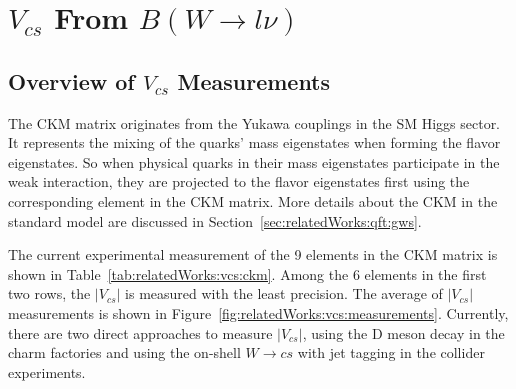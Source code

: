 
\section{$V_{cs}$ From $B(W\to l \nu)$ }
\label{sec:relatedWorks:vcs}

\subsection{Overview of $V_{cs}$ Measurements}

The CKM matrix originates from the Yukawa couplings in the SM Higgs sector. It represents the mixing of the quarks' mass eigenstates when forming the flavor eigenstates. So when physical quarks in their mass eigenstates participate in the weak interaction, they are projected to the flavor eigenstates first using the corresponding element in the CKM matrix. More details about the CKM in the standard model are discussed in Section~\ref{sec:relatedWorks:qft:gws}. 

\begin{table}[ht]
    \centering
    \setlength{\tabcolsep}{1.5em}
    \renewcommand{\arraystretch}{1.5}
    \caption{The current experimental world average of the 9 elements in the CKM matrix in the PDG \cite{pdg2020}.  }
    \label{tab:relatedWorks:vcs:ckm}
\end{table}


The current experimental measurement of the 9 elements in the CKM matrix \cite{pdg2020} is shown in Table~\ref{tab:relatedWorks:vcs:ckm}. Among the 6 elements in the first two rows, the $|V_{cs}|$ is measured with the least precision. The average of $|V_{cs}|$ measurements is shown in Figure~\ref{fig:relatedWorks:vcs:measurements}. Currently, there are two direct approaches to measure $|V_{cs}|$, using the D meson decay in the charm factories and using the on-shell $W\to c s$  with jet tagging in the collider experiments.

